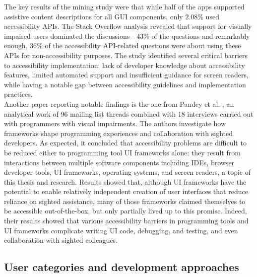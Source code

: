 The key results of the mining study were that while half of the apps supported assistive content descriptions for all GUI components, only 2.08\% used accessibility APIs. The Stack Overflow analysis revealed that support for visually impaired users dominated the discussions - 43\% of the questions-and remarkably enough, 36\% of the accessibility API-related questions were about using these APIs for non-accessibility purposes. The study identified several critical barriers to accessibility implementation: lack of developer knowledge about accessibility features, limited automated support and insufficient guidance for screen readers, while having a notable gap between accessibility guidelines and implementation practices. \\

Another paper reporting notable findings is the one from Pandey et al. \cite{pandey2022accessibility}, an analytical work of 96 mailing list threads combined with 18 interviews carried out with programmers with visual impairments. The authors investigate how frameworks shape programming experiences and collaboration with sighted developers. As expected, it concluded that accessibility problems are difficult to be reduced either to programming tool UI frameworks alone: they result from interactions between multiple software components including IDEs, browser developer tools, UI frameworks, operating systems, and screen readers, a topic of this thesis and research. Results showed that, although UI frameworks have the potential to enable relatively independent creation of user interfaces that reduce reliance on sighted assistance, many of those frameworks claimed themselves to be accessible out-of-the-box, but only partially lived up to this promise. Indeed, their results showed that various accessibility barriers in programming tools and UI frameworks complicate writing UI code, debugging, and testing, and even collaboration with sighted colleagues. 

\subsection{User categories and development approaches}

